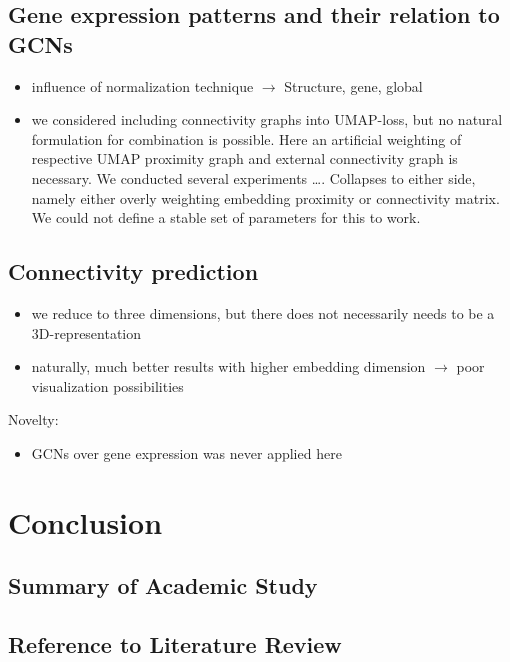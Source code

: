 \documentclass[]{article}
\begin{document}
\subsection{Gene expression patterns and their relation to GCNs}

\begin{itemize}
	\item influence of normalization technique $\rightarrow$ Structure, gene, global
	\item we considered including connectivity graphs into UMAP-loss, but no natural formulation for combination is possible. Here an artificial weighting of respective UMAP proximity graph and external connectivity graph is necessary. We conducted several experiments \dots. Collapses to either side, namely either overly weighting embedding proximity or connectivity matrix. We could not define a stable set of parameters for this to work. 
\end{itemize}

\subsection{Connectivity prediction}

\begin{itemize}
	\item we reduce to three dimensions, but there does not necessarily needs to be a 3D-representation
	\item naturally, much better results with higher embedding dimension $\rightarrow$ poor visualization possibilities
\end{itemize}

Novelty:
\begin{itemize}
	\item GCNs over gene expression was never applied here
\end{itemize}



\newpage
\section{Conclusion}
\label{sec:conclusion}

\subsection*{Summary of Academic Study}
\subsection*{Reference to Literature Review}
\end{document}
